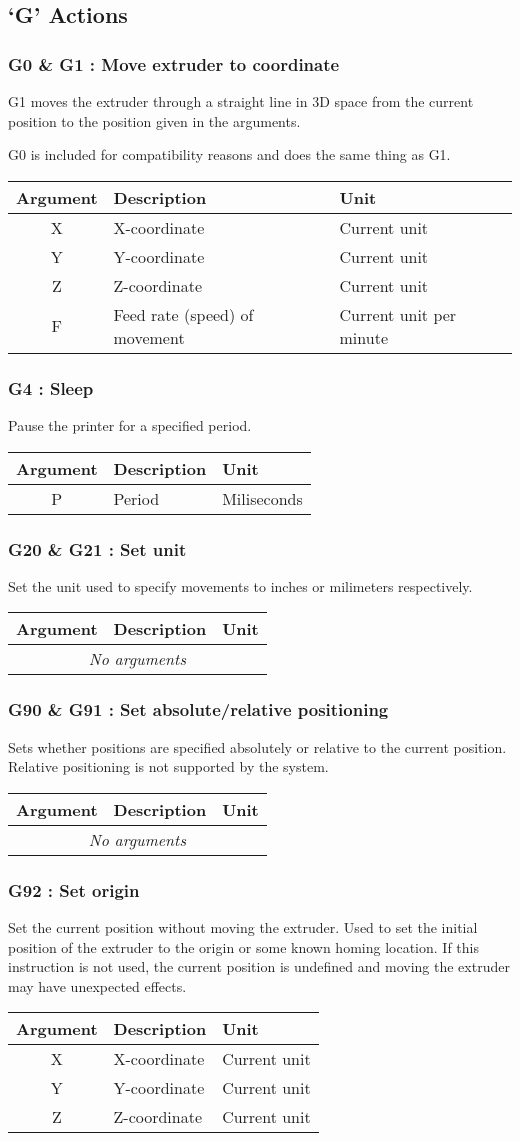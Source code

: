 		\newcommand{\gcodeaction}[4]{
			\subsubsection{#1 : #2}
				#3
				
				\begin{table}[H]
					\begin{tabular}{c p{0.41\textwidth} p{0.41\textwidth}}
						\toprule
						Argument & Description & Unit \\
						\midrule
						#4
						\bottomrule
					\end{tabular}
				\end{table}
		}
		\newcommand{\gcodearg}[3]{#1 & #2 & #3 \\}
		\newcommand{\gcodenoargs}{\multicolumn{3}{c}{\emph{No arguments}}\\}
		
		\subsection{`G' Actions}
			
			\gcodeaction{G0 \& G1}{Move extruder to coordinate}{
				G1 moves the extruder through a straight line in 3D space from the
				current position to the position given in the arguments.
				
				G0 is included for compatibility reasons and does the same thing as G1.
			}{
				\gcodearg{X}{X-coordinate}{Current unit}
				\gcodearg{Y}{Y-coordinate}{Current unit}
				\gcodearg{Z}{Z-coordinate}{Current unit}
				\gcodearg{F}{Feed rate (speed) of movement}{Current unit per minute}
			}
			
			\gcodeaction{G4}{Sleep}{
				Pause the printer for a specified period.
			}{
				\gcodearg{P}{Period}{Miliseconds}
			}
			
			\gcodeaction{G20 \& G21}{Set unit}{
				Set the unit used to specify movements to inches or milimeters
				respectively.
			}{
				\gcodenoargs
			}
			
			\gcodeaction{G90 \& G91}{Set absolute/relative positioning}{
				Sets whether positions are specified absolutely or relative to the
				current position. Relative positioning is not supported by the system.
			}{
				\gcodenoargs
			}
			
			\gcodeaction{G92}{Set origin}{
				Set the current position without moving the extruder. Used to set the
				initial position of the extruder to the origin or some known homing
				location. If this instruction is not used, the current position is
				undefined and moving the extruder may have unexpected effects.
			}{
				\gcodearg{X}{X-coordinate}{Current unit}
				\gcodearg{Y}{Y-coordinate}{Current unit}
				\gcodearg{Z}{Z-coordinate}{Current unit}
			}
		
